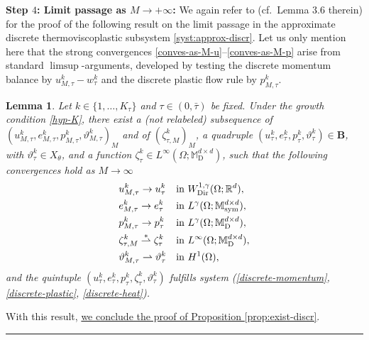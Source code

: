 \documentclass[a4paper,10pt,reqno]{amsart}
\numberwithin{equation}{section}
\newcommand{\bbM}{\mathbb{M}}
\newcommand{\R}{\mathbb{R}}
\numberwithin{equation}{section}
\newtheorem{lemma}[theorem]{Lemma}
\newcommand{\weakto}{\rightharpoonup} %
\newcommand{\weaksto}{\overset{*}{\rightharpoonup}}
\newcommand{\teta}{\vartheta}
\newcommand{\Dir}{\mathrm{Dir}}
\newcommand{\QED}{\mbox{}\hfill\rule{5pt}{5pt}\medskip\par}
\newcommand{\mt}{\bbM}
\newcommand{\sym}{\mathrm{sym}}
\newcommand{\dev}{\mathrm{D}}
\newcommand{\spt}{X_\theta}
\newcommand{\rbsp}{\mathbf{B}}
\newcommand{\wtau}[1]{w_\tau^{#1}}
\newcommand{\utau}[1]{u_\tau^{#1}}
\newcommand{\ptau}[1]{p_\tau^{#1}}
\newcommand{\etau}[1]{e_\tau^{#1}}
\newcommand{\tetau}[1]{\teta_\tau^{#1}}
\newcommand{\tetaum}[1]{\teta_{M,\tau}^{#1}}
\newcommand{\utaum}[1]{u_{M,\tau}^{#1}}
\newcommand{\ptaum}[1]{p_{M,\tau}^{#1}}
\newcommand{\etaum}[1]{e_{M,\tau}^{#1}}
\newcommand{\zetau}[1]{\zeta_{\tau}^{#1}}
\newcommand{\zetaum}[1]{\zeta_{\tau,M}^{#1}}
\newcommand{\EEE}{\color{black}}
\newcommand{\MMM}{\color{black}}%
\begin{document}
\par
\noindent 
\textbf{Step $4$: Limit passage as $M\to+\infty$:} We again refer to \cite{Rossi2016} (cf.\ Lemma 3.6 therein) for the proof of the following result
on the limit passage
in the approximate discrete thermoviscoplastic subsystem \eqref{syst:approx-discr}. \MMM Let us only mention here that the strong convergences \eqref{conves-as-M-u}--\eqref{conves-as-M-p} arise from standard
 $\limsup$-arguments, developed by testing   the discrete momentum balance by $\utaum k - \wtau k$ 
 and the discrete plastic flow rule by $\ptaum k$.  \EEE 
\begin{lemma}
\label{l:3.6}
 Let $ k \in \{1,\ldots, K_\tau\} $  and $\tau\in (0,\bar\tau)$  be fixed. Under  the growth condition \eqref{hyp-K}, there exist a (not relabeled) subsequence
  of   $(\utaum k, \etaum k,\ptaum k,\tetaum k)_{M}$  and of $(\zetaum k)_M$,  a quadruple $(\utau k, \etau k, \ptau k,\tetau k) \in
  \rbsp$, with $\tetau k \in \spt$, and  a function
  $\zetau k \in   L^\infty(\Omega;\mt_\dev^{d\times d}) $,   such that the following convergences hold as $M\to\infty$
 \begin{subequations}
 \label{conves-as-M}
 \begin{align}
  \label{conves-as-M-u}
 &  \utaum k \to \utau  k  &&  \text{in } W_\Dir^{1,\gamma}(\Omega;\R^d),
 \\
  \label{conves-as-M-e}
 &  \etaum k \to \etau  k  &&  \text{in } L^{\gamma}(\Omega;\mt_\sym^{d\times d}),
 \\
  \label{conves-as-M-p}
 &  \ptaum k \to \ptau  k &&  \text{in } L^{\gamma}(\Omega;\mt_\dev^{d\times d}),
  \\
  \label{conves-as-M-zeta}
 &  \zetaum k \weaksto \zetau k  &&  \text{in } L^{\infty}(\Omega;\mt_\dev^{d\times d}),
 \\
  \label{conves-as-M-teta}
 &  \tetaum k \weakto \tetau k && \text{in }  \MMM H^1(\Omega), \EEE %
 \end{align}
\end{subequations}
and the quintuple $(\utau k, \etau k, \ptau k,\zetau k,\tetau k)$ fulfills system (\ref{discrete-momentum}, \ref{discrete-plastic}, \ref{discrete-heat}). 
\end{lemma}
With this result, \underline{we conclude the proof of Proposition \ref{prop:exist-discr}}. 
\QED
\end{document}
